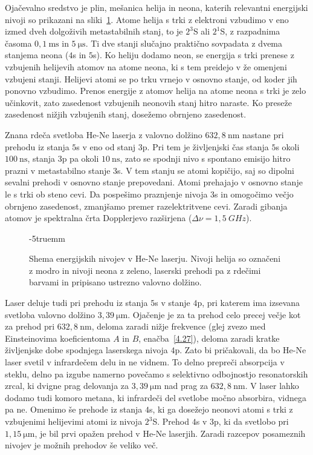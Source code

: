 Ojačevalno sredstvo je plin, mešanica helija in neona, katerih relevantni
energijski nivoji so prikazani na sliki~\ref{fig:HeNeE}. 
Atome helija
s trki z elektroni vzbudimo v eno izmed dveh dolgoživih metastabilnih stanj, 
to je $2^3$S ali
$2^1$S, z razpadnima časoma $0,1~\si{\milli\second}$ in $5~\si{\micro\second}$.
Ti dve stanji slučajno praktično sovpadata z dvema stanjema neona ($4$s in $5$s). 
Ko heliju dodamo neon, se energija s trki 
prenese z vzbujenih helijevih atomov na atome neona, ki s tem preidejo v 
že omenjeni vzbujeni stanji. Helijevi atomi se po trku vrnejo v osnovno stanje, od koder
jih ponovno vzbudimo. Prenos energije z atomov helija na atome neona s trki je 
zelo učinkovit, zato zasedenost vzbujenih neonovih stanj hitro naraste. Ko preseže 
zasedenost nižjih vzbujenih stanj, dosežemo obrnjeno zasedenost. 

Znana rdeča svetloba He-Ne laserja z valovno dolžino $632,8~\si{\nano\metre}$ nastane 
pri prehodu iz stanja $5$s v eno od stanj $3$p. Pri tem je življenjski čas 
stanja $5$s okoli $100~\si{\nano\second}$, stanja $3$p pa okoli $10~\si{\nano\second}$, zato
se spodnji nivo s spontano emisijo hitro prazni v metastabilno stanje $3$s. 
V tem stanju se atomi kopičijo, saj so dipolni sevalni prehodi v osnovno stanje prepovedani.
Atomi prehajajo v osnovno stanje le s trki ob steno cevi. Da pospešimo
praznjenje nivoja $3$s in omogočimo večjo obrnjeno zasedenost, zmanjšamo 
premer razelektritvene cevi. Zaradi gibanja atomov je spektralna 
črta Dopplerjevo razširjena ($\Delta \nu = 1,5~\si{GHz}$).
\begin{figure}[ht]
\centering
\def\svgwidth{95truemm} 

\caption{Shema energijskih nivojev v He-Ne laserju. Nivoji helija so označeni
z modro in nivoji neona z zeleno, laserski prehodi pa z rdečimi barvami in pripisano
ustrezno valovno dolžino.}
\vglue-5truemm
\label{fig:HeNeE}
\end{figure}

Laser deluje tudi pri prehodu iz stanja $5$s v stanje $4$p, pri katerem 
ima izsevana svetloba valovno dolžino $3,39~\si{\micro\metre}$. 
Ojačenje je za ta prehod celo precej večje kot za
prehod pri $632,8~\si{\nano\metre}$, deloma zaradi nižje frekvence 
(glej zvezo med Einsteinovima koeficientoma $A$ in $B$, enačba~\ref{4.27}), 
deloma zaradi kratke življenjske dobe spodnjega laserskega nivoja $4$p. 
Zato bi pričakovali, da bo He-Ne laser svetil v infrardečem delu in ne vidnem. 
To delno prepreči absorpcija v steklu, delno pa izgube namerno povečamo s selektivno odbojnostjo
resonatorskih zrcal, ki dvigne prag delovanja za $3,39~\si{\micro\metre}$ 
nad prag za $632,8~\si{\nano\metre}$. V laser lahko dodamo tudi
komoro metana, ki infrardeči del svetlobe močno absorbira, vidnega pa ne.
Omenimo še prehode iz stanja $4$s, ki ga dosežejo neonovi atomi s trki
z vzbujenimi helijevimi atomi iz nivoja $2^3$S. Prehod $4$s v $3$p, ki da svetlobo
pri $1,15~\si{\micro\metre}$, je bil prvi opažen prehod v He-Ne laserjih.
Zaradi razcepov posameznih nivojev je možnih prehodov še veliko več.

